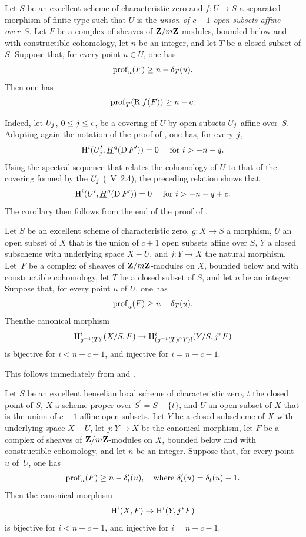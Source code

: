 \begin{corollaire} \label{XIV.4.3}
Let $S$ be an excellent scheme of characteristic zero and $f\colon U\to S$ a separated morphism of finite type such that $U$ is the \emph{union of $c+1$ open subsets affine over~$S$}. Let $F$ be a complex of sheaves of $\ZZ/m\ZZ$-modules, bounded below and with constructible cohomology, let $n$ be an integer, and let $T$ be a closed subset of $S$. Suppose that, for every point $u\in U$, one has
$$
\prof_{u}(F)\geq n-\delta_{T}(u).
$$
Then one has\pageoriginale
$$
\prof_{T}(\R_{!}f(F))\geq n-c.
$$
\end{corollaire}

Indeed, let $U_{\sisi{i}{j}}$, $0\leq \sisi{i}{j}\leq c$, be a covering of $U$ by open subsets $U_{\sisi{i}{j}}$ affine over~$S$. Adopting again the notation of the proof of , one has, for every $\sisi{i}{j}$,
$$
\H^{i}(U_{\sisi{i}{j}}^{\prime}, \underline{H}^{q}(\D F^{\prime}))=0\quad\textrm{ for }i>-n-q.
$$
Using the spectral sequence that relates the cohomology of $U$ to that of the covering formed by the $U_{\sisi{i}{j}}$ (~V~2.4), the preceding relation shows that
$$
\H^{i}(U^{\prime}, \underline{H}^{q}(\D F^{\prime}))=0\quad\textrm{ for }i>-n-q+c.
$$
The corollary then follows from the end of the proof of .

\begin{corollaire} \label{XIV.4.4}
Let $S$ be an excellent scheme of characteristic zero, $g\colon X\to S$ a morphism, $U$ an open subset of $X$ that is the union of $c+1$ open subsets affine over $S$, $Y$ a closed subscheme with underlying space $X-U$, and $j\colon Y\to X$ the natural morphism. Let~$F$ be a complex of sheaves of $\ZZ/m\ZZ$-modules on $X$, bounded below and with constructible cohomology, let $T$ be a closed subset of $S$, and let $n$ be an integer. Suppose that, for every point $u$ of $U$, one has
$$
\prof_{u}(F)\geq n-\delta_{T}(u).
$$
Then\pageoriginale the canonical morphism
$$
\H_{g^{-1}(T)!}^{i}(X/S, F)\to\H_{(g^{-1}(T)\cap Y)!}^{i}(Y/S, j^{\ast}F)$$
is bijective for $i<n-c-1$, and injective for $i=n-c-1$.
\end{corollaire}

This follows immediately from  and .

\begin{corollaire} \label{XIV.4.5}
Let $S$ be an excellent henselian local scheme of characteristic zero, $t$ the closed point of $S$, $X$ a scheme proper over $S^{\prime}=S-\{ t\}$, and $U$ an open subset of $X$ that is the union of $c+1$ affine open subsets. Let $Y$ be a closed subscheme of $X$ with underlying space $X-U$, let $j\colon Y\to X$ be the canonical morphism, let $F$ be a complex of sheaves of $\ZZ/m\ZZ$-modules on $X$, bounded below and with constructible cohomology, and let $n$ be an integer. Suppose that, for every point $u$ of~$U$, one has
$$
\prof_{u}(F)\geq n-\delta_{t}^{\prime}(u), \quad\text{where } \delta_{t}^{\prime}(u)=\delta_{t}(u)-1.
$$
Then the canonical morphism
$$
\H^{i}(X, F)\to\H^{i}(Y, j^{\ast}F)$$
is bijective for $i<n-c-1$, and injective for $i=n-c-1$.
\end{corollaire}

